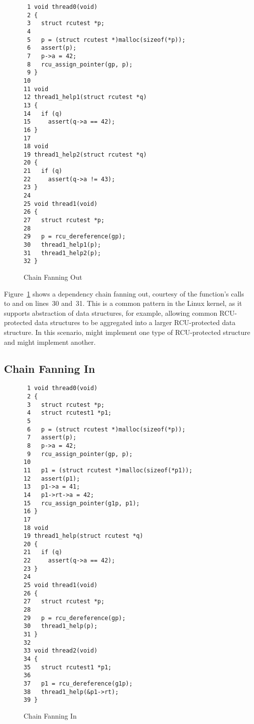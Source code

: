 \documentclass[letterpaper,twocolumn,10pt]{article}
\begin{document}
\begin{figure}[tbp]
{ \scriptsize
\begin{verbatim}
 1 void thread0(void)
 2 {
 3   struct rcutest *p;
 4
 5   p = (struct rcutest *)malloc(sizeof(*p));
 6   assert(p);
 7   p->a = 42;
 8   rcu_assign_pointer(gp, p);
 9 }
10
11 void
12 thread1_help1(struct rcutest *q)
13 {
14   if (q)
15     assert(q->a == 42);
16 }
17
18 void
19 thread1_help2(struct rcutest *q)
20 {
21   if (q)
22     assert(q->a != 43);
23 }
24
25 void thread1(void)
26 {
27   struct rcutest *p;
28
29   p = rcu_dereference(gp);
30   thread1_help1(p);
31   thread1_help2(p);
32 }
\end{verbatim}
}
\caption{Chain Fanning Out}
\label{fig:Chain Fanning Out}
\end{figure}

Figure~\ref{fig:Chain Fanning Out}
shows a dependency chain fanning out, courtesy of the 
function's calls to  and 
on lines~30 and~31.
This is a common pattern in the Linux kernel, as it supports
abstraction of data structures, for example, allowing common RCU-protected
data structures to be aggregated into a larger RCU-protected data
structure.
In this scenario,  might implement one type of
RCU-protected structure and  might implement
another.

\subsection{Chain Fanning In}
\label{sec:Chain Fanning In}

\begin{figure}[tbp]
{ \scriptsize
\begin{verbatim}
 1 void thread0(void)
 2 {
 3   struct rcutest *p;
 4   struct rcutest1 *p1;
 5
 6   p = (struct rcutest *)malloc(sizeof(*p));
 7   assert(p);
 8   p->a = 42;
 9   rcu_assign_pointer(gp, p);
10
11   p1 = (struct rcutest *)malloc(sizeof(*p1));
12   assert(p1);
13   p1->a = 41;
14   p1->rt->a = 42;
15   rcu_assign_pointer(g1p, p1);
16 }
17
18 void
19 thread1_help(struct rcutest *q)
20 {
21   if (q)
22     assert(q->a == 42);
23 }
24
25 void thread1(void)
26 {
27   struct rcutest *p;
28
29   p = rcu_dereference(gp);
30   thread1_help(p);
31 }
32
33 void thread2(void)
34 {
35   struct rcutest1 *p1;
36
37   p1 = rcu_dereference(g1p);
38   thread1_help(&p1->rt);
39 }
\end{verbatim}
}
\caption{Chain Fanning In}
\label{fig:Chain Fanning In}
\end{figure}
\end{document}
